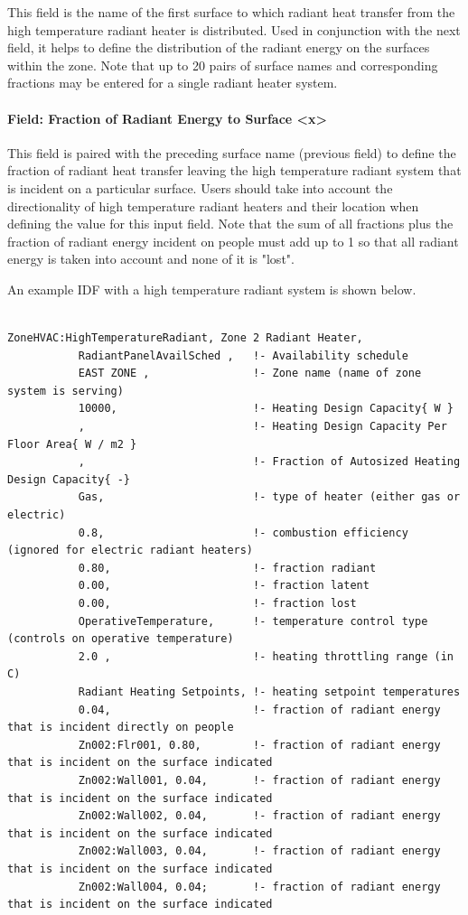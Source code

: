 This field is the name of the first surface to which radiant heat transfer from the high temperature radiant heater is distributed. Used in conjunction with the next field, it helps to define the distribution of the radiant energy on the surfaces within the zone. Note that up to 20 pairs of surface names and corresponding fractions may be entered for a single radiant heater system.

\paragraph{Field: Fraction of Radiant Energy to Surface \textless{}x\textgreater{}}\label{field-fraction-of-radiant-energy-to-surface-x-2}

This field is paired with the preceding surface name (previous field) to define the fraction of radiant heat transfer leaving the high temperature radiant system that is incident on a particular surface. Users should take into account the directionality of high temperature radiant heaters and their location when defining the value for this input field. Note that the sum of all fractions plus the fraction of radiant energy incident on people must add up to 1 so that all radiant energy is taken into account and none of it is "lost".

An example IDF with a high temperature radiant system is shown below.

\begin{lstlisting}

ZoneHVAC:HighTemperatureRadiant, Zone 2 Radiant Heater,
           RadiantPanelAvailSched ,   !- Availability schedule
           EAST ZONE ,                !- Zone name (name of zone system is serving)
           10000,                     !- Heating Design Capacity{ W }
           ,                          !- Heating Design Capacity Per Floor Area{ W / m2 }
           ,                          !- Fraction of Autosized Heating Design Capacity{ -}
           Gas,                       !- type of heater (either gas or electric)
           0.8,                       !- combustion efficiency (ignored for electric radiant heaters)
           0.80,                      !- fraction radiant
           0.00,                      !- fraction latent
           0.00,                      !- fraction lost
           OperativeTemperature,      !- temperature control type (controls on operative temperature)
           2.0 ,                      !- heating throttling range (in C)
           Radiant Heating Setpoints, !- heating setpoint temperatures
           0.04,                      !- fraction of radiant energy that is incident directly on people
           Zn002:Flr001, 0.80,        !- fraction of radiant energy that is incident on the surface indicated
           Zn002:Wall001, 0.04,       !- fraction of radiant energy that is incident on the surface indicated
           Zn002:Wall002, 0.04,       !- fraction of radiant energy that is incident on the surface indicated
           Zn002:Wall003, 0.04,       !- fraction of radiant energy that is incident on the surface indicated
           Zn002:Wall004, 0.04;       !- fraction of radiant energy that is incident on the surface indicated
\end{lstlisting}


